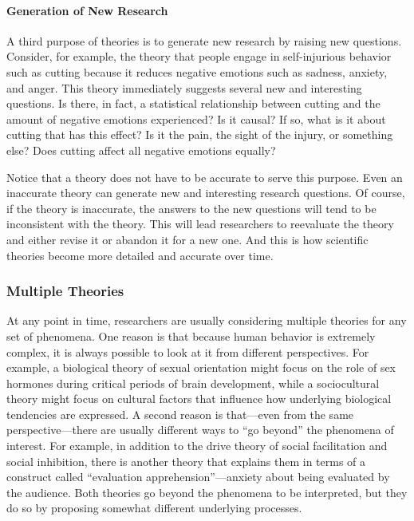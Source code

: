 \documentclass[
]{krantz}
\begin{document}
\paragraph*{Generation of New Research}\label{generation-of-new-research}

A third purpose of theories is to generate new research by raising new questions. Consider, for example, the theory that people engage in self-injurious behavior such as cutting because it reduces negative emotions such as sadness, anxiety, and anger. This theory immediately suggests several new and interesting questions. Is there, in fact, a statistical relationship between cutting and the amount of negative emotions experienced? Is it causal? If so, what is it about cutting that has this effect? Is it the pain, the sight of the injury, or something else? Does cutting affect all negative emotions equally?

Notice that a theory does not have to be accurate to serve this purpose. Even an inaccurate theory can generate new and interesting research questions. Of course, if the theory is inaccurate, the answers to the new questions will tend to be inconsistent with the theory. This will lead researchers to reevaluate the theory and either revise it or abandon it for a new one. And this is how scientific theories become more detailed and accurate over time.

\subsubsection*{Multiple Theories}\label{multiple-theories}


At any point in time, researchers are usually considering multiple theories for any set of phenomena. One reason is that because human behavior is extremely complex, it is always possible to look at it from different perspectives. For example, a biological theory of sexual orientation might focus on the role of sex hormones during critical periods of brain development, while a sociocultural theory might focus on cultural factors that influence how underlying biological tendencies are expressed. A second reason is that---even from the same perspective---there are usually different ways to ``go beyond'' the phenomena of interest. For example, in addition to the drive theory of social facilitation and social inhibition, there is another theory that explains them in terms of a construct called ``evaluation apprehension''---anxiety about being evaluated by the audience. Both theories go beyond the phenomena to be interpreted, but they do so by proposing somewhat different underlying processes.
\end{document}
